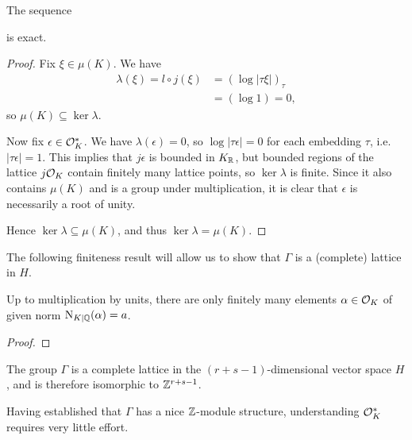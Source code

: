 \begin{proposition}
The sequence
\begin{center}
\end{center}
is exact.
\end{proposition}
\begin{proof}
	Fix $\xi\in\mu(K)$. We have
	\begin{align*}
		\lambda(\xi) = l\circ j(\xi) &= \left(\log|\tau\xi|\right)_\tau\\
			&= (\log 1) = 0,
	\end{align*}
	so $\mu(K)\subseteq\ker\lambda$.

	Now fix $\epsilon\in\mathcal{O}^*_K$. We have $\lambda(\epsilon)=0$, so $\log|\tau\epsilon|=0$ for each embedding $\tau$, i.e. $|\tau\epsilon|=1$. This implies that $j\epsilon$ is bounded in $K_{\mathbb{R}}$, but bounded regions of the lattice $j\mathcal{O}_K$ contain finitely many lattice points, so $\ker\lambda$ is finite. Since it also contains $\mu(K)$ and is a group under multiplication, it is clear that $\epsilon$ is necessarily a root of unity.

	Hence $\ker\lambda\subseteq\mu(K)$, and thus $\ker\lambda=\mu(K)$.
\end{proof}

The following finiteness result will allow us to show that $\Gamma$ is a (complete) lattice in $H$.

\begin{lemma}
	Up to multiplication by units, there are only finitely many elements $\alpha\in\mathcal{O}_K$ of given norm $\operatorname{N}_{K\mid\mathbb{Q}}(\alpha)=a$.
\end{lemma}
\begin{proof}
\end{proof}

\begin{theorem}
	The group $\Gamma$ is a complete lattice in the $(r+s-1)$-dimensional vector space $H$, and is therefore isomorphic to $\mathbb{Z}^{r+s-1}$.
\end{theorem}

Having established that $\Gamma$ has a nice $\mathbb{Z}$-module structure, understanding $\mathcal{O}^*_K$ requires very little effort.

